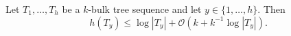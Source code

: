 \documentclass[10pt, conference, compsocconf]{IEEEtran}
\newcommand{\Oh}{\mathcal{O}}
\let\le\leqslant
\begin{document}
\begin{lem}
  Let $T_1,\dots,T_h$ be a $k$-bulk tree sequence and let $y\in\{1,\dots,h\}$.
  Then
\[
h(T_y)\le \log|T_y| + \Oh(k+k^{-1}\log|T_y|).
\]
\end{lem}


\end{document}
